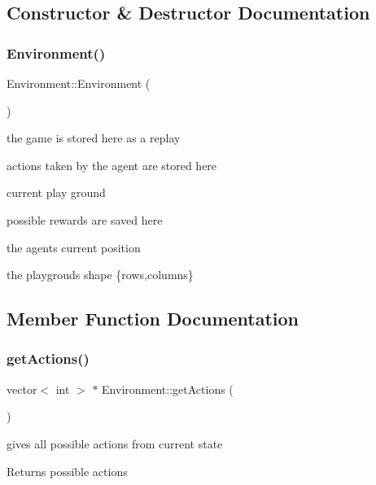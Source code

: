 \subsection{Constructor \& Destructor Documentation}
\mbox{\label{class_environment_a8b427c4448d8b7536666837521b9e83d}} 
\subsubsection{\texorpdfstring{Environment()}{Environment()}}
{\footnotesize\ttfamily Environment\+::\+Environment (\begin{DoxyParamCaption}{ }\end{DoxyParamCaption})\hspace{0.3cm}{\ttfamily [inline]}}

the game is stored here as a replay

actions taken by the agent are stored here

current play ground

possible rewards are saved here

the agents current position

the playgrouds shape \{rows,columns\}

\subsection{Member Function Documentation}
\mbox{\label{class_environment_a98a9bfe041ae2fad721a96ee092fa45b}} 
\subsubsection{\texorpdfstring{get\+Actions()}{getActions()}}
{\footnotesize\ttfamily vector$<$ int $>$ $\ast$ Environment\+::get\+Actions (\begin{DoxyParamCaption}{ }\end{DoxyParamCaption})}

gives all possible actions from current state \begin{DoxyReturn}{Returns}
possible actions 
\end{DoxyReturn}
\mbox{\label{class_environment_a93f31f5c387e9a470f49957f5a65aa31}} 
